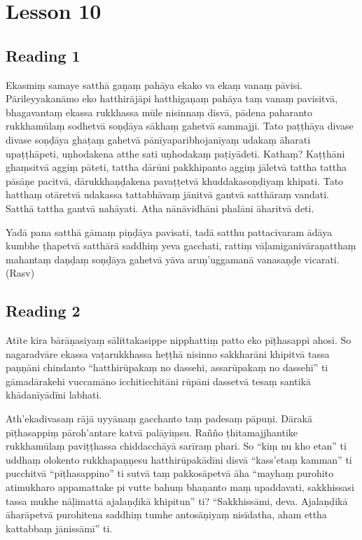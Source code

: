 \chapter{Lesson 10}

\section*{Reading 1}

Ekasmiṃ samaye satthā gaṇaṃ pahāya ekako va ekaṃ vanaṃ pāvisi. Pārileyyakanāmo eko hatthirājāpi hatthigaṇaṃ pahāya taṃ vanaṃ pavisitvā, bhagavantaṃ ekassa rukkhassa mūle nisinnaṃ disvā, pādena paharanto rukkhamūlaṃ sodhetvā soṇḍāya sākhaṃ gahetvā sammajji. Tato paṭṭhāya divase divase soṇḍāya ghaṭaṃ gahetvā pānīyaparibhojanīyaṃ udakaṃ āharati upaṭṭhāpeti, uṇhodakena atthe sati uṇhodakaṃ paṭiyādeti. Kathaṃ? Kaṭṭhāni ghaṃsitvā aggiṃ pāteti, tattha dārūni pakkhipanto aggiṃ jāletvā tattha tattha pāsāṇe pacitvā, dārukkhaṇḍakena pavaṭṭetvā khuddakasoṇḍiyaṃ khipati. Tato hatthaṃ otāretvā udakassa tattabhāvaṃ jānitvā gantvā satthāraṃ vandati. Satthā tattha gantvā nahāyati. Atha nānāvidhāni phalāni āharitvā deti.

Yadā pana satthā gāmaṃ piṇḍāya pavisati, tadā satthu pattacīvaram ādāya kumbhe ṭhapetvā satthārā saddhiṃ yeva gacchati, rattiṃ vāḷamiganivāraṇatthaṃ mahantaṃ daṇḍaṃ soṇḍāya gahetvā yāva aruṇ’uggamanā vanasaṇḍe vicarati. \hfill(Rasv)

\section*{Reading 2}

Atīte kira bārāṇasiyaṃ sālittakasippe nipphattiṃ patto eko pīṭhasappi ahosi. So nagaradvāre ekassa vaṭarukkhassa heṭṭhā nisinno sakkharāni khipitvā tassa paṇṇāni chindanto “hatthirūpakaṃ no dassehi, assarūpakaṃ no dassehī” ti gāmadārakehi vuccamāno icchiticchitāni rūpāni dassetvā tesaṃ santikā khādanīyādīni labhati.

Ath’ekadivasaṃ rājā uyyānaṃ gacchanto taṃ padesaṃ pāpuṇi. Dārakā pīṭhasappiṃ pāroh’antare katvā palāyiṃsu. Rañño ṭhitamajjhantike rukkhamūlaṃ paviṭṭhassa chiddacchāyā sarīraṃ phari. So “kiṃ nu kho etan” ti uddhaṃ olokento rukkhapaṇṇesu hatthirūpakādīni disvā “kass’etaṃ kamman” ti pucchitvā “pīṭhasappino” ti sutvā taṃ pakkosāpetvā āha “mayhaṃ purohito atimukharo appamattake pi vutte bahuṃ bhaṇanto maṃ upaddavati, sakkhissasi tassa mukhe nāḷimattā ajalaṇḍikā khipitun” ti? “Sakkhissāmi, deva. Ajalaṇḍikā āharāpetvā purohitena saddhiṃ tumhe antosāṇiyaṃ nisīdatha, aham ettha kattabbaṃ jānissāmī” ti.

